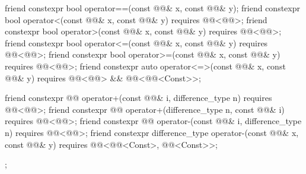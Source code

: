 \begin{codeblock}
{{    friend constexpr bool operator==(const @@& x, const @@& y);
    friend constexpr bool operator<(const @@& x, const @@& y)
      requires @@<@@>;
    friend constexpr bool operator>(const @@& x, const @@& y)
      requires @@<@@>;
    friend constexpr bool operator<=(const @@& x, const @@& y)
      requires @@<@@>;
    friend constexpr bool operator>=(const @@& x, const @@& y)
      requires @@<@@>;
    friend constexpr auto operator<=>(const @@& x, const @@& y)
      requires @@<@@> && @@<@@<Const>>;

    friend constexpr @@ operator+(const @@& i, difference_type n)
      requires @@<@@>;
    friend constexpr @@ operator+(difference_type n, const @@& i)
      requires @@<@@>;
    friend constexpr @@ operator-(const @@& i, difference_type n)
      requires @@<@@>;
    friend constexpr difference_type operator-(const @@& x, const @@& y)
      requires @@<@@<Const>, @@<Const>>;
  };
}
\end{codeblock}

